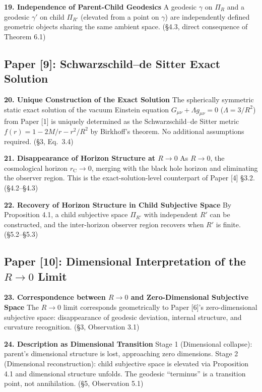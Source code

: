 \documentclass[12pt,a4paper]{article}
\begin{document}
\textbf{19. Independence of Parent-Child Geodesics}\quad
A geodesic $\gamma$ on $\Pi_R$ and a geodesic $\gamma'$ on child $\Pi_{R'}$ (elevated from a point on $\gamma$) are independently defined geometric objects sharing the same ambient space. (\S 4.3, direct consequence of Theorem 6.1)

\subsection*{Paper [9]: Schwarzschild--de Sitter Exact Solution}

\textbf{20. Unique Construction of the Exact Solution}\quad
The spherically symmetric static exact solution of the vacuum Einstein equation $G_{\mu\nu} + \Lambda g_{\mu\nu} = 0$ ($\Lambda = 3/R^2$) from Paper {[1]} is uniquely determined as the Schwarzschild--de Sitter metric $f(r) = 1 - 2M/r - r^2/R^2$ by Birkhoff's theorem. No additional assumptions required. (\S 3, Eq.\ 3.4)

\textbf{21. Disappearance of Horizon Structure at $R \to 0$}\quad
As $R \to 0$, the cosmological horizon $r_{\mathrm{C}} \to 0$, merging with the black hole horizon and eliminating the observer region. This is the exact-solution-level counterpart of Paper {[4]} \S 3.2. (\S 4.2--\S 4.3)

\textbf{22. Recovery of Horizon Structure in Child Subjective Space}\quad
By Proposition 4.1, a child subjective space $\Pi_{R'}$ with independent $R'$ can be constructed, and the inter-horizon observer region recovers when $R'$ is finite. (\S 5.2--\S 5.3)

\subsection*{Paper [10]: Dimensional Interpretation of the $R \to 0$ Limit}

\textbf{23. Correspondence between $R \to 0$ and Zero-Dimensional Subjective Space}\quad
The $R \to 0$ limit corresponds geometrically to Paper {[6]}'s zero-dimensional subjective space: disappearance of geodesic deviation, internal structure, and curvature recognition. (\S 3, Observation 3.1)

\textbf{24. Description as Dimensional Transition}\quad
Stage 1 (Dimensional collapse): parent's dimensional structure is lost, approaching zero dimensions. Stage 2 (Dimensional reconstruction): child subjective space is elevated via Proposition 4.1 and dimensional structure unfolds. The geodesic ``terminus'' is a transition point, not annihilation. (\S 5, Observation 5.1)
\end{document}
